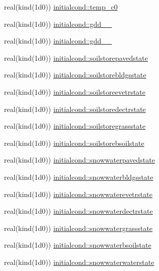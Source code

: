 \begin{DoxyCompactItemize}
real(kind(1d0)) \hyperlink{namespaceinitialcond_a61adf7674cde4a05c39ceaaecac23076}{initialcond\+::temp\+\_\+c0}
\item 
real(kind(1d0)) \hyperlink{namespaceinitialcond_a2d30ed9339c2a7ee9a08bd15cb04e6a4}{initialcond\+::gdd\+\_\+\_}
\item 
real(kind(1d0)) \hyperlink{namespaceinitialcond_a7f2ecdcc8fa8441223d109c577f7ce40}{initialcond\+::gdd\+\_\+\_}
\item 
real(kind(1d0)) \hyperlink{namespaceinitialcond_aeefca775739fc6fb0d57b02d5ba9c49f}{initialcond\+::soilstorepavedstate}
\item 
real(kind(1d0)) \hyperlink{namespaceinitialcond_af657c0f9875b9819e2d30a94b1fa4775}{initialcond\+::soilstorebldgsstate}
\item 
real(kind(1d0)) \hyperlink{namespaceinitialcond_a8d369e85991a26996ec9d7b226047194}{initialcond\+::soilstoreevetrstate}
\item 
real(kind(1d0)) \hyperlink{namespaceinitialcond_afeaa0ac5f4a21ca31fd443227c408360}{initialcond\+::soilstoredectrstate}
\item 
real(kind(1d0)) \hyperlink{namespaceinitialcond_ac44c5ebd71aa0e5742ac992047c0ab9c}{initialcond\+::soilstoregrassstate}
\item 
real(kind(1d0)) \hyperlink{namespaceinitialcond_a5d2a214e9dff8eb0fcb911d705d71684}{initialcond\+::soilstorebsoilstate}
\item 
real(kind(1d0)) \hyperlink{namespaceinitialcond_af36f3c934c44327d689b18eb9026b813}{initialcond\+::snowwaterpavedstate}
\item 
real(kind(1d0)) \hyperlink{namespaceinitialcond_afbba2830d10fca6c2e2a8ea93e8c9a38}{initialcond\+::snowwaterbldgsstate}
\item 
real(kind(1d0)) \hyperlink{namespaceinitialcond_a276984b02077d85421623a51cf86ad6f}{initialcond\+::snowwaterevetrstate}
\item 
real(kind(1d0)) \hyperlink{namespaceinitialcond_a65a1391e82bed313d590fb746fc28b09}{initialcond\+::snowwaterdectrstate}
\item 
real(kind(1d0)) \hyperlink{namespaceinitialcond_a6fa88050456f833f1937cdc877b87605}{initialcond\+::snowwatergrassstate}
\item 
real(kind(1d0)) \hyperlink{namespaceinitialcond_aa0f1d30ee29cd34825ab00ee65ea1739}{initialcond\+::snowwaterbsoilstate}
\item 
real(kind(1d0)) \hyperlink{namespaceinitialcond_a665ef7ff3d3626422d630673de6c82cb}{initialcond\+::snowwaterwaterstate}
\item 

\end{DoxyCompactItemize}
